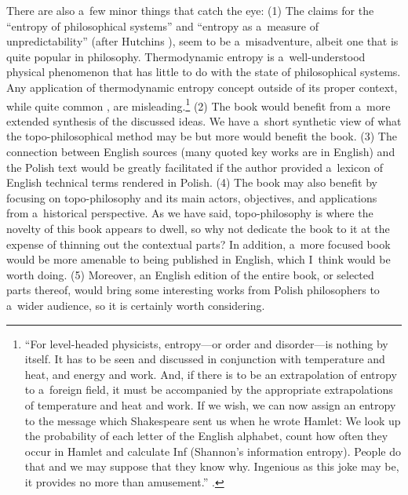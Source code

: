 There are also a~few minor things that catch the eye: (1) The claims for the ``entropy of philosophical systems'' 
\parencite[][p.172]{skowron_czesc_2021} %
 and ``entropy as a~measure of unpredictability'' (after Hutchins 
\parencite*[][]{hutchins_concepts_2012}%
), seem to be a~misadventure, albeit one that is quite popular in philosophy. Thermodynamic entropy is a~well-understood physical phenomenon that has little to do with the state of philosophical systems. Any application of thermodynamic entropy concept outside of its proper context, while quite common 
\parencite[see e.g.][]{muller_history_2007}, %
 are misleading.\footnote{``For level-headed physicists, entropy---or order and disorder---is nothing by itself. It has to be seen and discussed in conjunction with temperature and heat, and energy and work. And, if there is to be an extrapolation of entropy to a~foreign field, it must be accompanied by the appropriate extrapolations of temperature and heat and work. If we wish, we can now assign an entropy to the message which Shakespeare sent us when he wrote Hamlet: We look up the probability of each letter of the English alphabet, count how often they occur in Hamlet and calculate Inf (Shannon's information entropy). People do that and we may suppose that they know why. Ingenious as this joke may be, it provides no more than amusement.'' 
\parencite[][pp.133–134]{muller_history_2007}. %
 } (2) The book would benefit from a~more extended synthesis of the discussed ideas. We have a~short synthetic view of what the topo-philosophical method may be but more would benefit the book. (3) The connection between English sources (many quoted key works are in English) and the Polish text would be greatly facilitated if the author provided a~lexicon of English technical terms rendered in Polish. (4) The book may also benefit by focusing on topo-philosophy and its main actors, objectives, and applications from a~historical perspective. As we have said, topo-philosophy is where the novelty of this book appears to dwell, so why not dedicate the book to it at the expense of thinning out the contextual parts? In addition, a~more focused book would be more amenable to being published in English, which I~think would be worth doing. (5) Moreover, an English edition of the entire book, or selected parts thereof, would bring some interesting works from Polish philosophers to a~wider audience, so it is certainly worth considering.



